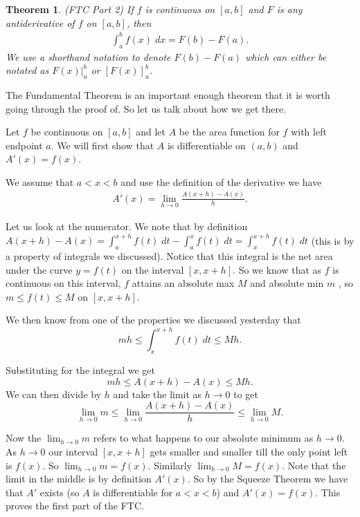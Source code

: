 \documentclass[12pt,reqno]{article}
\newtheorem{Theorem}{Theorem}
\theoremstyle{definition}
\begin{document}
\begin{Theorem}
	(FTC Part 2) If $f$ is continuous on $[a, b]$ and $F$ is any antiderivative of $f$ on $[a, b]$, then \begin{align*}
		\int_{a}^{b} f(x) \; dx = F(b) - F(a).
	\end{align*}
	We use a shorthand notation to denote $F(b) - F(a)$ which can either be notated as $\left.F(x)\right|_{a}^{b}$ or $\left[F(x)\right]_{a}^{b}$. 
\end{Theorem}

The Fundamental Theorem is an important enough theorem that it is worth going through the proof of. So let us talk about how we get there. 

Let $f$ be continuous on $[a, b]$ and let $A$ be the area function for $f$ with left endpoint $a$. We will first show that $A$ is differentiable on $(a, b)$ and $A'(x) = f(x)$.

We assume that $a < x < b$ and use the definition of the derivative we have 
\begin{align*}
	A'(x) = \lim_{h \to 0} \frac{A(x + h) - A(x)}{h}.
\end{align*}

Let us look at the numerator. We note that by definition $A(x + h) - A(x) = \int_{a}^{x + h} f(t) \; dt - \int_{a}^{x} f(t) \; dt = \int_{x}^{x + h} f(t) \; dt$ (this is by a property of integrals we discussed). Notice that this integral is the net area under the curve $y = f(t)$ on the interval $[x, x + h]$. So we know that as $f$ is continuous on this interval, $f$ attains an absolute max $M$ and absolute min $m$ , so $m \leq f(t) \leq M$ on $[x, x + h]$. 

We then know from one of the properties we discussed yesterday that $$mh \leq \int_{x}^{x + h} f(t) \; dt \leq M h.$$ 

Substituting for the integral we get $$mh \leq A(x + h) - A(x) \leq M h.$$ 
We can then divide by $h$ and take the limit as $h \to 0$ to get $$\lim_{h \to 0} m \leq \lim_{h \to 0} \frac{A(x + h) - A(x)}{h} \leq \lim_{h \to 0} M.$$

Now the $\lim_{h \to 0} m$ refers to what happens to our absolute minimum as $h \to 0$. As $h \to 0$ our interval $[x, x + h]$ gets smaller and smaller till the only point left is $f(x)$. So $\lim_{h \to 0} m = f(x)$. Similarly $\lim_{h \to 0} M = f(x)$. Note that the limit in the middle is by definition $A'(x)$. So by the Squeeze Theorem we have that $A'$ exists (so $A$ is differentiable for $a < x < b$) and $A'(x) = f(x)$. This proves the first part of the FTC. 
\end{document}
